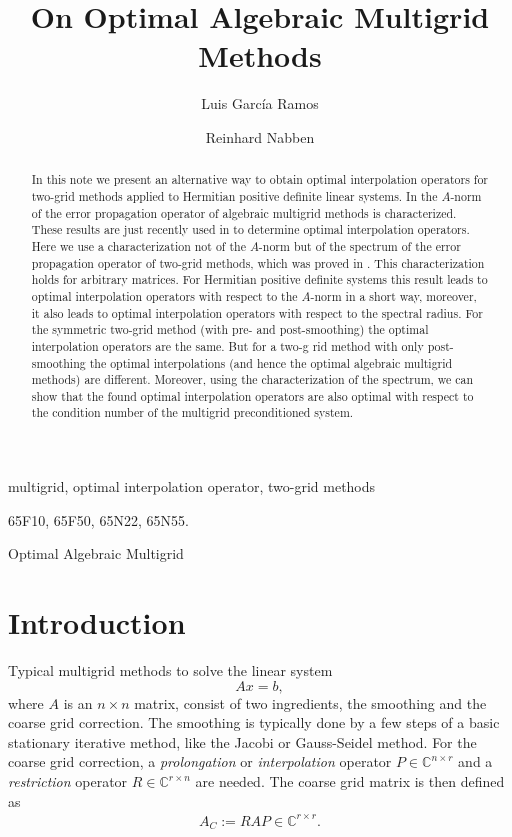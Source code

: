 \documentclass[final]{siamltex}
\author{
Luis Garc\'{i}a Ramos\footnotemark[1]
\and
Reinhard Nabben\footnotemark[1]
}
\title{On Optimal Algebraic Multigrid Methods}
\newcommand{\innCrr}{\in\mathbb{C}^{r\times r}}
\newcommand{\beq}{\begin{eqnarray}}
\newcommand{\eeq}{\end{eqnarray}}
\numberwithin{equation}{section}
\newcommand{\Crn}{\mathbb{C}^{r \times n}}
\newcommand{\Cnr}{\mathbb{C}^{n \times r}}
\begin{document}
\maketitle
\renewcommand{\thefootnote}{\fnsymbol{footnote}}

\renewcommand{\thefootnote}{\arabic{footnote}}
\begin{abstract}
In this note we present an alternative way to obtain optimal
interpolation operators for two-grid methods applied to Hermitian positive
definite linear systems.  In \cite{FalVZ05,Zik08} the $A$-norm of the error
propagation operator of algebraic multigrid methods is characterized. These
results are just recently used in \cite{XuZ17, Bra18} to determine optimal
interpolation operators. Here we use a characterization not of the $A$-norm but
of the spectrum of the  error propagation operator of two-grid methods, which
was proved in  \cite{GarKN18}. This characterization holds for arbitrary
matrices. For Hermitian positive definite systems this result   leads to
optimal interpolation operators with respect to the $A$-norm in a short way, 
moreover, it also leads to optimal interpolation operators with respect to the
spectral radius. For the symmetric two-grid method (with pre- and 
post-smoothing)
the optimal interpolation operators are the same. But for a two-g
rid method with only post-smoothing the optimal interpolations (and hence the
optimal algebraic multigrid
methods) are  different.  Moreover, using the  characterization of the
spectrum,
we can show that the found  optimal interpolation operators are also optimal
with
respect to the condition number of the multigrid preconditioned system.  
\end{abstract}


\begin{keywords}
multigrid, optimal interpolation operator, two-grid methods
\end{keywords}

\begin{AMS}
65F10, 65F50, 65N22, 65N55.
\end{AMS}

\pagestyle{myheadings}
\thispagestyle{plain}
 {Optimal Algebraic Multigrid}

\section{Introduction}
Typical multigrid methods to solve the linear system 
\[
Ax = b,
\]
where $A$ is an $n \times n$ matrix, consist  of two ingredients, the smoothing
and  the
coarse grid correction. The smoothing is typically done by a
few
steps of a basic stationary iterative method, like the Jacobi or Gauss-Seidel
method.  For the coarse grid correction,
 a {\it prolongation} or {\it interpolation}
operator $P \in \Cnr$ and a   {\it
restriction} operator $R \in \Crn$  are needed. The coarse grid matrix is then
defined as
\beq \label{def:multAC}
A_C :=  RAP \innCrr.
\eeq 
\end{document}
